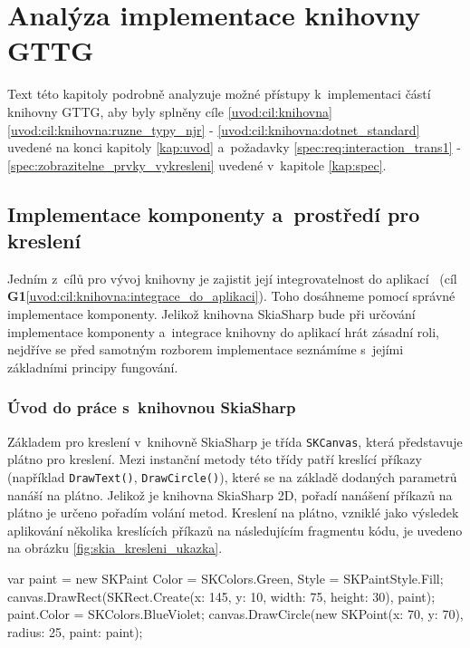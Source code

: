 \chapter{Analýza implementace knihovny GTTG}
Text této kapitoly podrobně analyzuje možné přístupy k~implementaci částí knihovny GTTG, aby byly splněny cíle \ref{uvod:cil:knihovna} \ref{uvod:cil:knihovna:ruzne_typy_njr} - \ref{uvod:cil:knihovna:dotnet_standard} uvedené na konci kapitoly \ref{kap:uvod} a~požadavky \ref{spec:req:interaction_trans1} - \ref{spec:zobrazitelne_prvky_vykresleni} uvedené v~kapitole \ref{kap:spec}.

\section[Implementace komponenty a~prostředí pro kreslení]{Implementace komponenty a~prostředí pro kreslení}
\label{kap:impl:komp}
Jedním z~cílů pro vývoj knihovny je zajistit její integrovatelnost do aplikací ~(cíl \textbf{\color{goalcolor}G1}\ref{uvod:cil:knihovna:integrace_do_aplikaci}). Toho dosáhneme pomocí správné implementace komponenty. Jelikož knihovna SkiaSharp bude při určování implementace komponenty a~integrace knihovny do aplikací hrát zásadní roli, nejdříve se před samotným rozborem implementace seznámíme s~jejími základními principy fungování.

\subsection{Úvod do práce s~knihovnou SkiaSharp} 
Základem pro kreslení v~knihovně SkiaSharp je třída \texttt{SKCanvas}, která představuje plátno pro kreslení. Mezi instanční metody této třídy patří kreslící příkazy (například \texttt{DrawText()}, \texttt{DrawCircle()}), které se na základě dodaných parametrů nanáší na plátno. Jelikož je knihovna SkiaSharp 2D, pořadí nanášení příkazů na plátno je určeno pořadím volání metod. Kreslení na plátno, vzniklé jako výsledek aplikování několika kreslících příkazů na následujícím fragmentu kódu, je uvedeno na obrázku \ref{fig:skia_kresleni_ukazka}.

\begin{csharpcode}
var paint = new SKPaint {Color = SKColors.Green, Style = SKPaintStyle.Fill};
canvas.DrawRect(SKRect.Create(x: 145, y: 10, width: 75, height: 30), paint);
paint.Color = SKColors.BlueViolet;
canvas.DrawCircle(new SKPoint(x: 70, y: 70), radius: 25, paint: paint);
\end{csharpcode}

